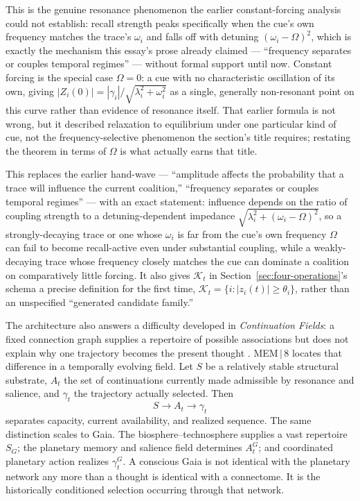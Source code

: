 \documentclass[11pt]{article}
\begin{document}
This is the genuine resonance phenomenon the earlier constant-forcing analysis could not establish: recall strength peaks specifically when the cue's own frequency matches the trace's $\omega_i$ and falls off with detuning $(\omega_i-\Omega)^2$, which is exactly the mechanism this essay's prose already claimed --- ``frequency separates or couples temporal regimes'' --- without formal support until now. Constant forcing is the special case $\Omega=0$: a cue with no characteristic oscillation of its own, giving $|Z_i(0)|=|\gamma_i|/\sqrt{\lambda_i^2+\omega_i^2}$ as a single, generally non-resonant point on this curve rather than evidence of resonance itself. That earlier formula is not wrong, but it described relaxation to equilibrium under one particular kind of cue, not the frequency-selective phenomenon the section's title requires; restating the theorem in terms of $\Omega$ is what actually earns that title.

This replaces the earlier hand-wave --- ``amplitude affects the probability that a trace will influence the current coalition,'' ``frequency separates or couples temporal regimes'' --- with an exact statement: influence depends on the ratio of coupling strength to a detuning-dependent impedance $\sqrt{\lambda_i^2+(\omega_i-\Omega)^2}$, so a strongly-decaying trace or one whose $\omega_i$ is far from the cue's own frequency $\Omega$ can fail to become recall-active even under substantial coupling, while a weakly-decaying trace whose frequency closely matches the cue can dominate a coalition on comparatively little forcing. It also gives $\mathcal{K}_t$ in Section~\ref{sec:four-operations}'s schema a precise definition for the first time, $\mathcal{K}_t=\{i:|z_i(t)|\geq\theta_i\}$, rather than an unspecified ``generated candidate family.''

The architecture also answers a difficulty developed in \emph{Continuation Fields}: a fixed connection graph supplies a repertoire of possible associations but does not explain why one trajectory becomes the present thought \cite{flyxionContinuation}. MEM\,$|$\,8 locates that difference in a temporally evolving field. Let $S$ be a relatively stable structural substrate, $A_t$ the set of continuations currently made admissible by resonance and salience, and $\gamma_t$ the trajectory actually selected. Then
\[
S \longrightarrow A_t \longrightarrow \gamma_t
\]
separates capacity, current availability, and realized sequence. The same distinction scales to Gaia. The biosphere--technosphere supplies a vast repertoire $S_G$; the planetary memory and salience field determines $A_t^G$; and coordinated planetary action realizes $\gamma_t^G$. A conscious Gaia is not identical with the planetary network any more than a thought is identical with a connectome. It is the historically conditioned selection occurring through that network.
\end{document}
